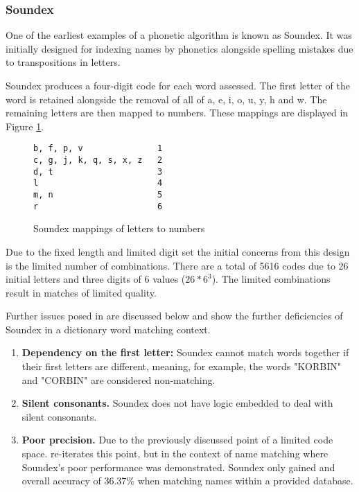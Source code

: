 \subsubsection*{Soundex}
\label{sec:soundex}
One of the earliest examples of a phonetic algorithm is known as Soundex. It was initially designed for indexing names by phonetics alongside spelling mistakes due to transpositions in letters. 

Soundex produces a four-digit code for each word assessed.
The first letter of the word is retained alongside the removal of all of a, e, i, o, u, y, h and w. The remaining letters are then mapped to numbers. These mappings are displayed in Figure \ref{fig:soundexMap}.

\begin{figure}[h!]
    \centering
    \begin{BVerbatim}
b, f, p, v               1
c, g, j, k, q, s, x, z   2
d, t                     3
l                        4
m, n                     5
r                        6
    \end{BVerbatim}

    \caption{Soundex mappings of letters to numbers}
    \label{fig:soundexMap}
\end{figure}

Due to the fixed length and limited digit set the initial concerns from this design is the limited number of combinations. There are a total of 5616 codes due to 26 initial letters and three digits of 6 values ($26 * 6^3$).
The limited combinations result in matches of limited quality.

Further issues posed in \cite{patman2001soundex} are discussed below and show the further deficiencies of Soundex in a dictionary word matching context. 

\begin{enumerate}
    \item \textbf{Dependency on the first letter:} Soundex cannot match words together if their first letters are different, meaning, for example, the words "KORBIN" and "CORBIN" are considered non-matching. 

    \item \textbf{Silent consonants.} Soundex does not have logic embedded to deal with silent consonants.

    \item \textbf{Poor precision.} Due to the previously discussed point of a limited code space. \cite{patman2001soundex} re-iterates this point, but in the context of name matching where Soundex's poor performance was demonstrated. Soundex only gained and overall accuracy of 36.37\% when matching names within a provided database.
\end{enumerate}

